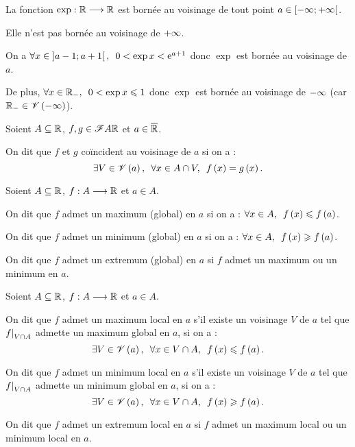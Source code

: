 \begin{ex}
La fonction \(\exp:\mathbb{R}\longrightarrow\mathbb{R}\) est bornée au voisinage de tout point \(a\in\left[-\infty;+\infty\right[\).

Elle n'est pas bornée au voisinage de \(+\infty\).
\end{ex}

\begin{dem}
On a \(\quantifs{\forall x\in\intervee{a-1}{a+1}}0<\exp x<\e{a+1}\) donc \(\exp\) est bornée au voisinage de \(a\).

De plus, \(\quantifs{\forall x\in\Rm}0<\exp x\leq1\) donc \(\exp\) est bornée au voisinage de \(-\infty\) (car \(\mathbb{R}_-\in\mathscr{V}\left(-\infty\right)\)).
\end{dem}

\begin{defi}
Soient \(A\subseteq\mathbb{R}\), \(f,g\in\mathscr{F}{A}{\mathbb{R}}\) et \(a\in\overline{\mathbb{R}}\).

On dit que \(f\) et \(g\) coïncident au voisinage de \(a\) si on a : \[\quantifs{\exists V\in\V{a};\forall x\in A\inter V}f\paren{x}=g\paren{x}.\]
\end{defi}

\begin{rappel}
Soient \(A\subseteq\mathbb{R}\), \(f:A\longrightarrow\mathbb{R}\) et \(a\in A\).

On dit que \(f\) admet un maximum (global) en \(a\) si on a : \(\quantifs{\forall x\in A}f\paren{x}\leq f\paren{a}\).

On dit que \(f\) admet un minimum (global) en \(a\) si on a : \(\quantifs{\forall x\in A}f\paren{x}\geq f\paren{a}\).

On dit que \(f\) admet un extremum (global) en \(a\) si \(f\) admet un maximum ou un minimum en \(a\).
\end{rappel}

\begin{defi}
Soient \(A\subseteq\mathbb{R}\), \(f:A\longrightarrow\mathbb{R}\) et \(a\in A\).

On dit que \(f\) admet un maximum local en \(a\) s'il existe un voisinage \(V\) de \(a\) tel que \(\restr{f}{V\inter A}\) admette un maximum global en \(a\), \cad si on a : \[\quantifs{\exists V\in\V{a};\forall x\in V\inter A}f\paren{x}\leq f\paren{a}.\]

On dit que \(f\) admet un minimum local en \(a\) s'il existe un voisinage \(V\) de \(a\) tel que \(\restr{f}{V\inter A}\) admette un minimum global en \(a\), \cad si on a : \[\quantifs{\exists V\in\V{a};\forall x\in V\inter A}f\paren{x}\geq f\paren{a}.\]

On dit que \(f\) admet un extremum local en \(a\) si \(f\) admet un maximum local ou un minimum local en \(a\).
\end{defi}

